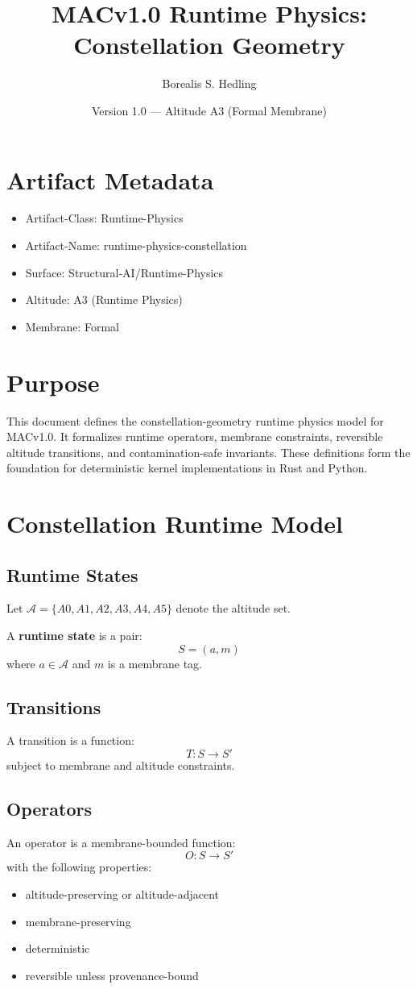 \documentclass[12pt]{article}
\title{MACv1.0 Runtime Physics: Constellation Geometry}
\author{Borealis S. Hedling}
\date{Version 1.0 — Altitude A3 (Formal Membrane)}
\begin{document}
\maketitle

\section*{Artifact Metadata}
\begin{itemize}
  \item Artifact-Class: Runtime-Physics
  \item Artifact-Name: runtime-physics-constellation
  \item Surface: Structural-AI/Runtime-Physics
  \item Altitude: A3 (Runtime Physics)
  \item Membrane: Formal
\end{itemize}

\section{Purpose}
This document defines the constellation-geometry runtime physics model for
MACv1.0. It formalizes runtime operators, membrane constraints, reversible
altitude transitions, and contamination-safe invariants. These definitions form
the foundation for deterministic kernel implementations in Rust and Python.

\section{Constellation Runtime Model}

\subsection{Runtime States}
Let $\mathcal{A} = \{A0, A1, A2, A3, A4, A5\}$ denote the altitude set.

A \textbf{runtime state} is a pair:
\[
S = (a, m)
\]
where $a \in \mathcal{A}$ and $m$ is a membrane tag.

\subsection{Transitions}
A transition is a function:
\[
T : S \rightarrow S'
\]
subject to membrane and altitude constraints.

\subsection{Operators}
An operator is a membrane-bounded function:
\[
O : S \rightarrow S'
\]
with the following properties:
\begin{itemize}
  \item altitude-preserving or altitude-adjacent
  \item membrane-preserving
  \item deterministic
  \item reversible unless provenance-bound
\end{itemize}
\end{document}
